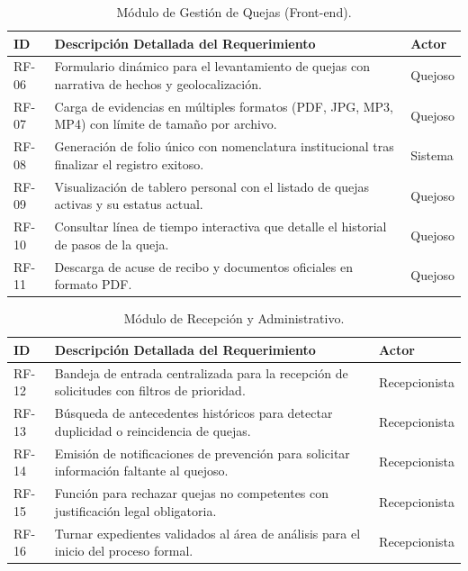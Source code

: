 \begin{table}[h!]
\centering
\scriptsize
\caption{Módulo de Gestión de Quejas (Front-end).}
\label{tab:rf_frontend}
\begin{tabular}{@{} l p{9.5cm} l @{}}
\toprule
\rowcolor[HTML]{2D3E50} 
\textbf{\color[HTML]{FFFFFF} ID} & \textbf{\color[HTML]{FFFFFF} Descripción Detallada del Requerimiento} & \textbf{\color[HTML]{FFFFFF} Actor} \\ \midrule
RF-06 & Formulario dinámico para el levantamiento de quejas con narrativa de hechos y geolocalización. & Quejoso \\
\rowcolor[HTML]{F2F4F7} 
RF-07 & Carga de evidencias en múltiples formatos (PDF, JPG, MP3, MP4) con límite de tamaño por archivo. & Quejoso \\
RF-08 & Generación de folio único con nomenclatura institucional tras finalizar el registro exitoso. & Sistema \\
\rowcolor[HTML]{F2F4F7} 
RF-09 & Visualización de tablero personal con el listado de quejas activas y su estatus actual. & Quejoso \\
RF-10 & Consultar línea de tiempo interactiva que detalle el historial de pasos de la queja. & Quejoso \\
\rowcolor[HTML]{F2F4F7} 
RF-11 & Descarga de acuse de recibo y documentos oficiales en formato PDF. & Quejoso \\ \bottomrule
\end{tabular}
\end{table}

\begin{table}[h!]
\centering
\scriptsize
\caption{Módulo de Recepción y Administrativo.}
\label{tab:rf_recepcion}
\begin{tabular}{@{} l p{9.5cm} l @{}}
\toprule
\rowcolor[HTML]{2D3E50} 
\textbf{\color[HTML]{FFFFFF} ID} & \textbf{\color[HTML]{FFFFFF} Descripción Detallada del Requerimiento} & \textbf{\color[HTML]{FFFFFF} Actor} \\ \midrule
RF-12 & Bandeja de entrada centralizada para la recepción de solicitudes con filtros de prioridad. & Recepcionista \\
\rowcolor[HTML]{F2F4F7} 
RF-13 & Búsqueda de antecedentes históricos para detectar duplicidad o reincidencia de quejas. & Recepcionista \\
RF-14 & Emisión de notificaciones de prevención para solicitar información faltante al quejoso. & Recepcionista \\
\rowcolor[HTML]{F2F4F7} 
RF-15 & Función para rechazar quejas no competentes con justificación legal obligatoria. & Recepcionista \\
RF-16 & Turnar expedientes validados al área de análisis para el inicio del proceso formal. & Recepcionista \\ \bottomrule
\end{tabular}
\end{table}

